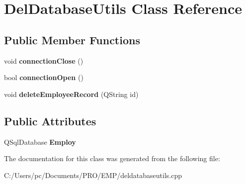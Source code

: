 \hypertarget{class_del_database_utils}{}\section{Del\+Database\+Utils Class Reference}
\label{class_del_database_utils}
\subsection*{Public Member Functions}
\begin{DoxyCompactItemize}
\item 
\mbox{\label{class_del_database_utils_ad4a80936857bfb7f53a06e5f3ce4627c}} 
void {\bfseries connection\+Close} ()
\item 
\mbox{\label{class_del_database_utils_a8a7064a79b1d6067f26c1fc5859e0072}} 
bool {\bfseries connection\+Open} ()
\item 
\mbox{\label{class_del_database_utils_ae4e210daae25b32f7243d8dba2d6537c}} 
void {\bfseries delete\+Employee\+Record} (Q\+String id)
\end{DoxyCompactItemize}
\subsection*{Public Attributes}
\begin{DoxyCompactItemize}
\item 
\mbox{\label{class_del_database_utils_ab9b1cdf9ab3707f14c578892f1da9c0c}} 
Q\+Sql\+Database {\bfseries Employ}
\end{DoxyCompactItemize}


The documentation for this class was generated from the following file\+:\begin{DoxyCompactItemize}
\item 
C\+:/\+Users/pc/\+Documents/\+P\+R\+O/\+E\+M\+P/deldatabaseutils.\+cpp\end{DoxyCompactItemize}
